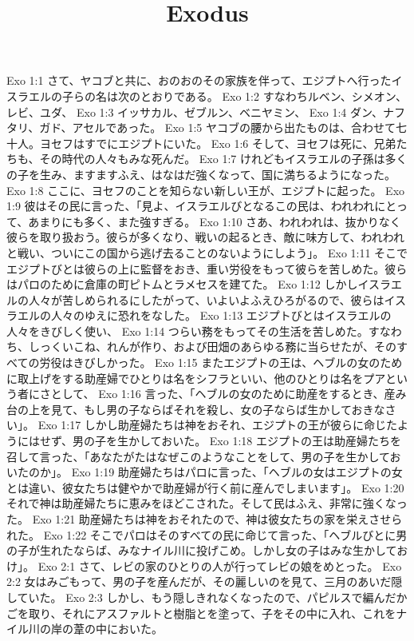 

\title{Exodus}

Exo 1:1  さて、ヤコブと共に、おのおのその家族を伴って、エジプトへ行ったイスラエルの子らの名は次のとおりである。
Exo 1:2  すなわちルベン、シメオン、レビ、ユダ、
Exo 1:3  イッサカル、ゼブルン、ベニヤミン、
Exo 1:4  ダン、ナフタリ、ガド、アセルであった。
Exo 1:5  ヤコブの腰から出たものは、合わせて七十人。ヨセフはすでにエジプトにいた。
Exo 1:6  そして、ヨセフは死に、兄弟たちも、その時代の人々もみな死んだ。
Exo 1:7  けれどもイスラエルの子孫は多くの子を生み、ますますふえ、はなはだ強くなって、国に満ちるようになった。
Exo 1:8  ここに、ヨセフのことを知らない新しい王が、エジプトに起った。
Exo 1:9  彼はその民に言った、「見よ、イスラエルびとなるこの民は、われわれにとって、あまりにも多く、また強すぎる。
Exo 1:10  さあ、われわれは、抜かりなく彼らを取り扱おう。彼らが多くなり、戦いの起るとき、敵に味方して、われわれと戦い、ついにこの国から逃げ去ることのないようにしよう」。
Exo 1:11  そこでエジプトびとは彼らの上に監督をおき、重い労役をもって彼らを苦しめた。彼らはパロのために倉庫の町ピトムとラメセスを建てた。
Exo 1:12  しかしイスラエルの人々が苦しめられるにしたがって、いよいよふえひろがるので、彼らはイスラエルの人々のゆえに恐れをなした。
Exo 1:13  エジプトびとはイスラエルの人々をきびしく使い、
Exo 1:14  つらい務をもってその生活を苦しめた。すなわち、しっくいこね、れんが作り、および田畑のあらゆる務に当らせたが、そのすべての労役はきびしかった。
Exo 1:15  またエジプトの王は、ヘブルの女のために取上げをする助産婦でひとりは名をシフラといい、他のひとりは名をプアという者にさとして、
Exo 1:16  言った、「ヘブルの女のために助産をするとき、産み台の上を見て、もし男の子ならばそれを殺し、女の子ならば生かしておきなさい」。
Exo 1:17  しかし助産婦たちは神をおそれ、エジプトの王が彼らに命じたようにはせず、男の子を生かしておいた。
Exo 1:18  エジプトの王は助産婦たちを召して言った、「あなたがたはなぜこのようなことをして、男の子を生かしておいたのか」。
Exo 1:19  助産婦たちはパロに言った、「ヘブルの女はエジプトの女とは違い、彼女たちは健やかで助産婦が行く前に産んでしまいます」。
Exo 1:20  それで神は助産婦たちに恵みをほどこされた。そして民はふえ、非常に強くなった。
Exo 1:21  助産婦たちは神をおそれたので、神は彼女たちの家を栄えさせられた。
Exo 1:22  そこでパロはそのすべての民に命じて言った、「ヘブルびとに男の子が生れたならば、みなナイル川に投げこめ。しかし女の子はみな生かしておけ」。
Exo 2:1  さて、レビの家のひとりの人が行ってレビの娘をめとった。
Exo 2:2  女はみごもって、男の子を産んだが、その麗しいのを見て、三月のあいだ隠していた。
Exo 2:3  しかし、もう隠しきれなくなったので、パピルスで編んだかごを取り、それにアスファルトと樹脂とを塗って、子をその中に入れ、これをナイル川の岸の葦の中においた。
